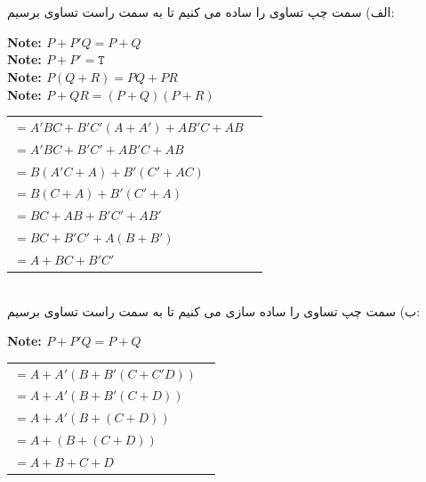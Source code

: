 \documentclass[a4paper]{article}
\newcommand{\mynote}{\textbf {\large {\color{red} Note:  }}}
\newcommand{\true}{\texttt{T}}
\begin{document}
\section{}
الف) سمت چپ تساوی را ساده می کنیم تا به سمت راست تساوی برسیم:
\\
\begin{latin} \noindent
					\mynote $ P + P'Q = P + Q $ \\
					\mynote $ P + P' = \true $ \\
					\mynote $ P(Q + R) = PQ + PR $ \\
					\mynote $ P + QR = (P + Q)(P + R) $ \\
 \end{latin}
\begin{tabular}{l l}
$ = A'BC + B'C'(A+A') + AB'C + AB $ & \\
$ = A'BC + B'C' + AB'C + AB $ &  \\
$ = B(A'C + A) + B'(C' + AC)$ & \\
$ = B(C + A) + B'(C' + A)$ & \\
$ = BC + AB + B'C' + AB'$ & \\
$ = BC + B'C' + A(B + B')$ & \\
$ = A + BC + B'C' $ & \\
\end{tabular}
\\[1cm]
ب) سمت چپ تساوی را ساده سازی می کنیم تا به سمت راست تساوی برسیم:
\\
\begin{latin} \mynote $ P + P'Q = P + Q $ \end{latin}
\begin{center}
\begin{tabular}{l l}
$ = A + A'(B + B'(C + C'D)) $ &  \\
$ = A + A'(B + B'(C + D)) $ & \\
$ = A + A'(B + (C + D)) $ & \\
$ = A + (B + (C + D)) $ & \\
$ = A + B + C + D $ & \\
\end{tabular}
\end{center}

\section{}
\end{document}
